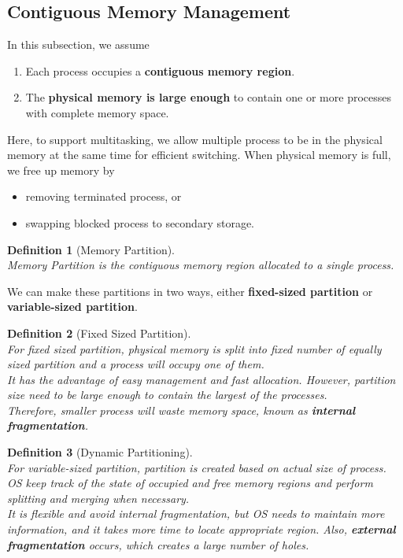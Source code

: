 \documentclass[12pt]{article}
\newtheorem{definition}{Definition}[section]
\theoremstyle{definition}
\begin{document}
\subsection{Contiguous Memory Management}
In this subsection, we assume
\begin{enumerate}
  \item Each process occupies a \textbf{contiguous memory region}.
  \item The \textbf{physical memory is large enough} to contain one or more processes with complete memory space.
\end{enumerate}
Here, to support multitasking, we allow multiple process to be in the physical memory at the same time for efficient switching. When physical memory is full, we free up memory by
\begin{itemize}
\item  removing terminated process, or 
\item swapping blocked process to secondary storage.
\end{itemize}
\begin{definition}[Memory Partition]
\hfill\\\normalfont Memory Partition is the contiguous memory region allocated to a single process.
\end{definition}
We can make these partitions in two ways, either \textbf{fixed-sized partition} or \textbf{variable-sized partition}.\\
\begin{definition}[Fixed Sized Partition]
\hfill\\\normalfont For fixed sized partition, physical memory is split into fixed number of equally sized partition and a process will occupy one of them.\\
It has the advantage of easy management and fast allocation. However, partition size need to be large enough to contain the largest of the processes.\\
Therefore, smaller process will waste memory space, known as \textbf{internal fragmentation}.
\end{definition}
\begin{definition}[Dynamic Partitioning]
\hfill\\\normalfont For variable-sized partition, partition is created based on actual size of process. OS keep track of the state of occupied and free memory regions and perform splitting and merging when necessary.\\
It is flexible and avoid internal fragmentation, but OS needs to maintain more information, and it takes more time to locate appropriate region. Also, \textbf{external fragmentation} occurs, which creates a large number of holes.
\end{definition}
\end{document}
